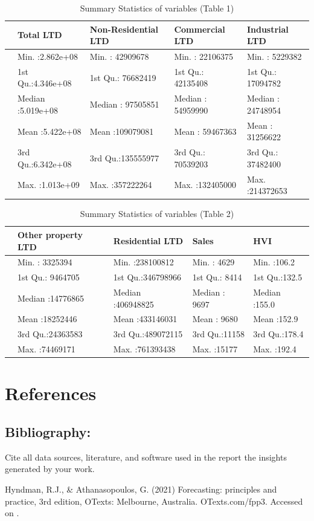 \documentclass[11pt,a4paper,]{article}
\begin{document}
\begin{table}

\caption{\label{tab:statsumone}Summary Statistics of variables (Table 1)}
\centering
\begin{tabular}[t]{lllll}
\toprule
  & Total LTD & Non-Residential LTD & Commercial LTD & Industrial LTD\\
\midrule
 & Min.   :2.862e+08 & Min.   : 42909678 & Min.   : 22106375 & Min.   :  5229382\\
 & 1st Qu.:4.346e+08 & 1st Qu.: 76682419 & 1st Qu.: 42135408 & 1st Qu.: 17094782\\
 & Median :5.019e+08 & Median : 97505851 & Median : 54959990 & Median : 24748954\\
 & Mean   :5.422e+08 & Mean   :109079081 & Mean   : 59467363 & Mean   : 31256622\\
 & 3rd Qu.:6.342e+08 & 3rd Qu.:135555977 & 3rd Qu.: 70539203 & 3rd Qu.: 37482400\\
\addlinespace
 & Max.   :1.013e+09 & Max.   :357222264 & Max.   :132405000 & Max.   :214372653\\
\bottomrule
\end{tabular}
\end{table}

\begin{table}

\caption{\label{tab:statsumtwo}Summary Statistics of variables (Table 2)}
\centering
\begin{tabular}[t]{lllll}
\toprule
  & Other property LTD & Residential LTD & Sales & HVI\\
\midrule
 & Min.   : 3325394 & Min.   :238100812 & Min.   : 4629 & Min.   :106.2\\
 & 1st Qu.: 9464705 & 1st Qu.:346798966 & 1st Qu.: 8414 & 1st Qu.:132.5\\
 & Median :14776865 & Median :406948825 & Median : 9697 & Median :155.0\\
 & Mean   :18252446 & Mean   :433146031 & Mean   : 9680 & Mean   :152.9\\
 & 3rd Qu.:24363583 & 3rd Qu.:489072115 & 3rd Qu.:11158 & 3rd Qu.:178.4\\
\addlinespace
 & Max.   :74469171 & Max.   :761393438 & Max.   :15177 & Max.   :192.4\\
\bottomrule
\end{tabular}
\end{table}

\section{References}\label{references}

\subsection{Bibliography:}\label{bibliography}

Cite all data sources, literature, and software used in the report the insights generated by your work.

Hyndman, R.J., \& Athanasopoulos, G. (2021) Forecasting: principles and practice, 3rd edition, OTexts: Melbourne, Australia. OTexts.com/fpp3. Accessed on .

\printbibliography
\end{document}
